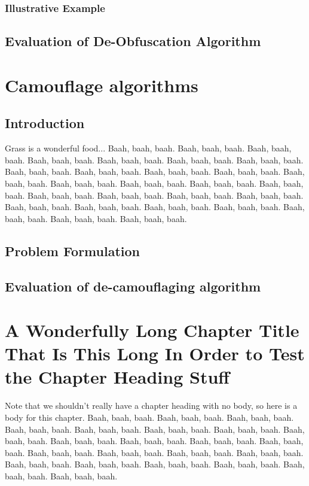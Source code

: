 \documentclass[proposal]{umassthesis}  %
\begin{document}
\subsection{Illustrative Example}

\section{Evaluation of De-Obfuscation Algorithm}

\chapter{Camouflage algorithms}

\section{Introduction}

Grass is a wonderful food...  Baah, baah, baah.  Baah, baah, baah.
Baah, baah, baah.  Baah, baah, baah.  Baah, baah, baah.  Baah, baah,
baah.  Baah, baah, baah.  Baah, baah, baah.  Baah, baah, baah.  Baah,
baah, baah.  Baah, baah, baah.  Baah, baah, baah.  Baah, baah, baah.
Baah, baah, baah.  Baah, baah, baah.  Baah, baah, baah.  Baah, baah,
baah.  Baah, baah, baah.  Baah, baah, baah.  Baah, baah, baah.  Baah,
baah, baah.  Baah, baah, baah.  Baah, baah, baah.  Baah, baah, baah.
Baah, baah, baah.  Baah, baah, baah.  Baah, baah, baah. 

\section{Problem Formulation}

\section{Evaluation of de-camouflaging algorithm}
\chapter{A Wonderfully Long Chapter Title That Is This Long In Order
  to Test the Chapter Heading Stuff}
Note that we shouldn't really have a chapter heading with no body, so
here is a body for this chapter.  Baah, baah, baah.  Baah, baah, baah.
Baah, baah, baah.  Baah, baah, baah.  Baah, baah, baah.  Baah, baah,
baah.  Baah, baah, baah.  Baah, baah, baah.  Baah, baah, baah.  Baah,
baah, baah.  Baah, baah, baah.  Baah, baah, baah.  Baah, baah, baah.
Baah, baah, baah.  Baah, baah, baah.  Baah, baah, baah.  Baah, baah,
baah.  Baah, baah, baah.  Baah, baah, baah.  Baah, baah, baah.  Baah,
baah, baah.  Baah, baah, baah. 
\end{document}
